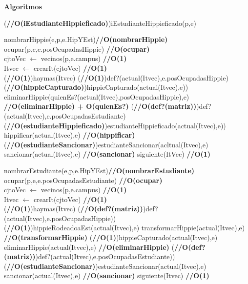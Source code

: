 \documentclass[a4paper,10pt]{article}
\newenvironment{Algoritmos}{%
  \vspace*{2ex}%
  \noindent\textbf{\Large Algoritmos}%
  \vspace*{2ex}%
}{}
\begin{document}
\begin{Algoritmos}
\begin{algorithm}[h]
   \Begin
   {
     \eIf(\hfill \textbf{//O(iEstudianteHippieficado)}){iEstudianteHippieficado(p,e)}
     {
       nombrarHippie(e,p,e.HipYEst)\hfill \textbf{//O(nombrarHippie)}\\
       ocupar(p,e,e.posOcupadasHippie) \hfill \textbf{//O(ocupar)}\\
       cjtoVec $\leftarrow$ vecinos(p,e.campus) \hfill \textbf{//O(1)}\\
       Itvec $\leftarrow$ crearIt(cjtoVec) \hfill \textbf{//O(1)}\\
       \While(\hfill \textbf{//O(1)}){haymas(Itvec)}
       {
         \If(\hfill \textbf{//O(1)}){def?(actual(Itvec),e.posOcupadasHippie)}
         {
           \If(\hfill \textbf{//O(hippieCapturado)}){hippieCapturado(actual(Itvec),e))}
           {
               eliminarHippie(quienEs?(actual(Itvec),posOcupadasHippie),e) \hfill \textbf{//O(eliminarHippie) + O(quienEs?)}
           }
         }
         \If(\hfill \textbf{//O(def?(matriz))}){def?(actual(Itvec),e.posOcupadasEstudiante)}
         {
           \If(\hfill \textbf{//O(estudianteHippieficado)}){estudianteHippieficado(actual(Itvec),e))}
             {
               hippificar(actual(Itvec),e) \hfill \textbf{//O(hippificar)}
             }
           \If(\hfill \textbf{//O(estudianteSancionar)}){estudianteSancionar(acltual(Itvec),e)}
             {
               sancionar(actual(Itvec),e) \hfill \textbf{//O(sancionar)}
             }
         }
         siguiente(ItVec) \hfill \textbf{//O(1)}
       }
           
     }%
      {
     nombrarEstudiante(e,p,e.HipYEst)\hfill \textbf{//O(nombrarEstudiante)}\\
     ocupar(p,e,e.posOcupadasEstudiante) \hfill \textbf{//O(ocupar)}\\
     cjtoVec $\leftarrow$ vecinos(p,e.campus) \hfill \textbf{//O(1)}\\
     Itvec $\leftarrow$ crearIt(cjtoVec) \hfill \textbf{//O(1)}\\
     \While(\hfill \textbf{//O(1)}){haymas(Itvec)}
     {
       \If(\hfill \textbf{//O(def?(matriz))}){def?(actual(Itvec),e.posOcupadasHippie))}
       {
         \If(\hfill \textbf{//O(1)}){hippieRodeadoaEst(actual(Itvec),e)}
           {
           transformarHippie(actual(Itvec),e) \hfill \textbf{//O(transformarHippie)}
           }
           \If(\hfill \textbf{//O(1)}){hippieCapturado(actual(Itvec),e)}
           {
           eliminarHippie(actual(Itvec),e) \hfill \textbf{//O(eliminarHippie)}
           }
       }
       \If(\hfill \textbf{//O(def?(matriz))}){def?(actual(Itvec),e.posOcupadasEstudiante))}
       {
         \If(\hfill \textbf{//O(estudianteSancionar)}){estudianteSancionar(actual(Itvec),e)}
         {
         sancionar(actual(Itvec),e) \hfill \textbf{//O(sancionar)}
         }
       }
     siguiente(Itvec) \hfill \textbf{//O(1)}
     }
   }
 
}
\end{algorithm}
\end{Algoritmos}
\end{document}
